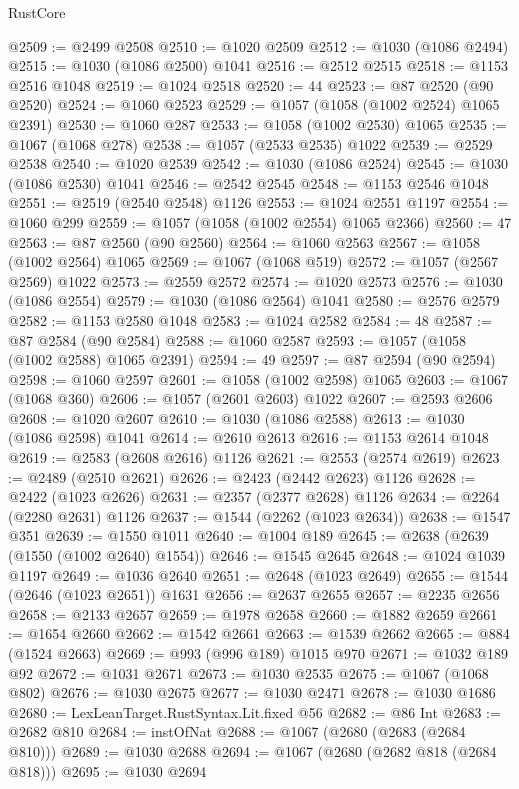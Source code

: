 \begin{lexlean}{RustCore}
\begin{coremodule}
@2509 := @2499 @2508
@2510 := @1020 @2509
@2512 := @1030 (@1086 @2494)
@2515 := @1030 (@1086 @2500) @1041
@2516 := @2512 @2515
@2518 := @1153 @2516 @1048
@2519 := @1024 @2518
@2520 := 44
@2523 := @87 @2520 (@90 @2520)
@2524 := @1060 @2523
@2529 := @1057 (@1058 (@1002 @2524) @1065 @2391)
@2530 := @1060 @287
@2533 := @1058 (@1002 @2530) @1065
@2535 := @1067 (@1068 @278)
@2538 := @1057 (@2533 @2535) @1022
@2539 := @2529 @2538
@2540 := @1020 @2539
@2542 := @1030 (@1086 @2524)
@2545 := @1030 (@1086 @2530) @1041
@2546 := @2542 @2545
@2548 := @1153 @2546 @1048
@2551 := @2519 (@2540 @2548) @1126
@2553 := @1024 @2551 @1197
@2554 := @1060 @299
@2559 := @1057 (@1058 (@1002 @2554) @1065 @2366)
@2560 := 47
@2563 := @87 @2560 (@90 @2560)
@2564 := @1060 @2563
@2567 := @1058 (@1002 @2564) @1065
@2569 := @1067 (@1068 @519)
@2572 := @1057 (@2567 @2569) @1022
@2573 := @2559 @2572
@2574 := @1020 @2573
@2576 := @1030 (@1086 @2554)
@2579 := @1030 (@1086 @2564) @1041
@2580 := @2576 @2579
@2582 := @1153 @2580 @1048
@2583 := @1024 @2582
@2584 := 48
@2587 := @87 @2584 (@90 @2584)
@2588 := @1060 @2587
@2593 := @1057 (@1058 (@1002 @2588) @1065 @2391)
@2594 := 49
@2597 := @87 @2594 (@90 @2594)
@2598 := @1060 @2597
@2601 := @1058 (@1002 @2598) @1065
@2603 := @1067 (@1068 @360)
@2606 := @1057 (@2601 @2603) @1022
@2607 := @2593 @2606
@2608 := @1020 @2607
@2610 := @1030 (@1086 @2588)
@2613 := @1030 (@1086 @2598) @1041
@2614 := @2610 @2613
@2616 := @1153 @2614 @1048
@2619 := @2583 (@2608 @2616) @1126
@2621 := @2553 (@2574 @2619)
@2623 := @2489 (@2510 @2621)
@2626 := @2423 (@2442 @2623) @1126
@2628 := @2422 (@1023 @2626)
@2631 := @2357 (@2377 @2628) @1126
@2634 := @2264 (@2280 @2631) @1126
@2637 := @1544 (@2262 (@1023 @2634))
@2638 := @1547 @351
@2639 := @1550 @1011
@2640 := @1004 @189
@2645 := @2638 (@2639 (@1550 (@1002 @2640) @1554))
@2646 := @1545 @2645
@2648 := @1024 @1039 @1197
@2649 := @1036 @2640
@2651 := @2648 (@1023 @2649)
@2655 := @1544 (@2646 (@1023 @2651)) @1631
@2656 := @2637 @2655
@2657 := @2235 @2656
@2658 := @2133 @2657
@2659 := @1978 @2658
@2660 := @1882 @2659
@2661 := @1654 @2660
@2662 := @1542 @2661
@2663 := @1539 @2662
@2665 := @884 (@1524 @2663)
@2669 := @993 (@996 @189) @1015 @970
@2671 := @1032 @189 @92
@2672 := @1031 @2671
@2673 := @1030 @2535
@2675 := @1067 (@1068 @802)
@2676 := @1030 @2675
@2677 := @1030 @2471
@2678 := @1030 @1686
@2680 := LexLeanTarget.RustSyntax.Lit.fixed @56
@2682 := @86 Int
@2683 := @2682 @810
@2684 := instOfNat
@2688 := @1067 (@2680 (@2683 (@2684 @810)))
@2689 := @1030 @2688
@2694 := @1067 (@2680 (@2682 @818 (@2684 @818)))
@2695 := @1030 @2694

\end{coremodule}
\end{lexlean}
